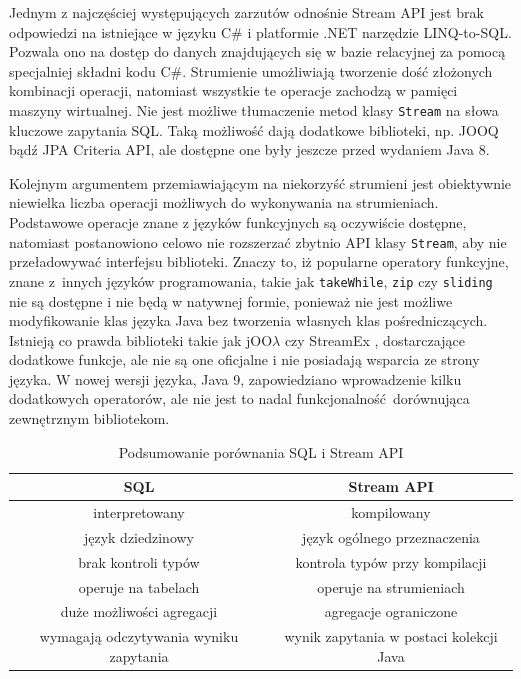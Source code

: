 \documentclass[12pt,twoside,openright]{extarticle}
\begin{document}
    Jednym z najczęściej występujących zarzutów odnośnie Stream API jest brak odpowiedzi na istniejące w języku C\# i platformie .NET narzędzie LINQ-to-SQL. Pozwala ono na dostęp do danych znajdujących się w bazie relacyjnej za pomocą specjalniej składni kodu C\#. Strumienie umożliwiają tworzenie dość złożonych kombinacji operacji, natomiast wszystkie te operacje zachodzą w pamięci maszyny wirtualnej. Nie jest możliwe tłumaczenie metod klasy \texttt{Stream} na słowa kluczowe zapytania SQL. Taką możliwość dają dodatkowe biblioteki, np. JOOQ bądź JPA Criteria API, ale dostępne one były jeszcze przed wydaniem Java 8. 

    Kolejnym argumentem przemiawiającym na niekorzyść strumieni jest obiektywnie niewielka liczba operacji możliwych do wykonywania na strumieniach. Podstawowe operacje znane z języków funkcyjnych są oczywiście dostępne, natomiast postanowiono celowo nie rozszerzać zbytnio API klasy \texttt{Stream}, aby nie przeładowywać interfejsu biblioteki. Znaczy to, iż popularne operatory funkcyjne, znane z~innych języków programowania, takie jak \texttt{takeWhile}, \texttt{zip} czy \texttt{sliding} nie są dostępne i nie będą w natywnej formie, ponieważ nie jest możliwe modyfikowanie klas języka Java bez tworzenia własnych klas pośredniczących. Istnieją co prawda biblioteki takie jak jOO$\lambda$ \cite{joolambda} czy StreamEx \cite{streamex}, dostarczające dodatkowe funkcje, ale nie są one oficjalne i nie posiadają wsparcia ze strony języka. W nowej wersji języka, Java 9, zapowiedziano wprowadzenie kilku dodatkowych operatorów, ale nie jest to nadal funkcjonalność dorównująca zewnętrznym bibliotekom.


\begin{table}[t]
    \label{comparison}
    \begin{center}
        \begin{tabular}{ |c|c| }
            \hline
            \textbf{SQL} & \textbf{Stream API} \\
            \hline

            interpretowany & kompilowany \\
            \hline

            język dziedzinowy & język ogólnego przeznaczenia \\
            \hline

            brak kontroli typów & kontrola typów przy kompilacji \\
            \hline

            operuje na tabelach & operuje na strumieniach \\
            \hline

            duże możliwości agregacji & agregacje ograniczone \\
            \hline

            wymagają odczytywania wyniku zapytania & wynik zapytania w postaci kolekcji Java \\
            \hline
        \end{tabular}

        \caption{Podsumowanie porównania SQL i Stream API}
    \end{center}
\end{table}
\end{document}

